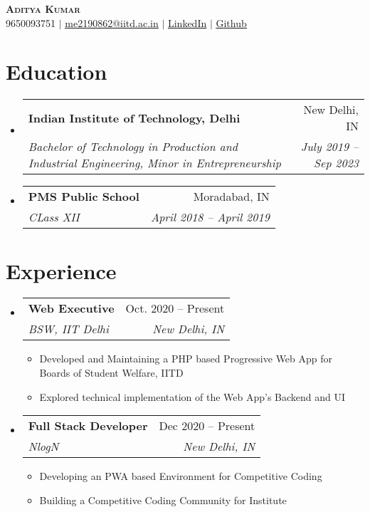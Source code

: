 \documentclass[letterpaper,11pt]{article}
\makeatletter
\newcommand{\resumeItem}[1]{
  \item\small{
    {#1 \vspace{-2pt}}
  }
}
\newcommand{\resumeSubheading}[4]{
  \vspace{-2pt}\item
    \begin{tabular*}{0.97\textwidth}[t]{l@{\extracolsep{\fill}}r}
      \textbf{#1} & #2 \\
      \textit{\small#3} & \textit{\small #4} \\
    \end{tabular*}\vspace{-7pt}
}
\newcommand{\resumeSubHeadingListStart}{\begin{itemize}[leftmargin=0.15in, label={}]}
\newcommand{\resumeSubHeadingListEnd}{\end{itemize}}
\newcommand{\resumeItemListStart}{\begin{itemize}}
\newcommand{\resumeItemListEnd}{\end{itemize}\vspace{-5pt}}
\makeatother
\begin{document}
\begin{center}
    \textbf{\Huge \scshape Aditya Kumar} \\ \vspace{5pt}
    \small 9650093751 $|$ \href{mailto:me2190862@iitd.ac.in}{\underline{me2190862@iitd.ac.in}} $|$ 
    \href{https://linkedin.com/in/aditya-kumar-inductor}{\underline{LinkedIn}} $|$
    \href{https://github.com/inductor69}{\underline{Github}}
\end{center}


\section{Education}
  \resumeSubHeadingListStart
    \resumeSubheading
      {Indian Institute of Technology, Delhi}{New Delhi, IN}
      {Bachelor of Technology in Production and Industrial Engineering, Minor in Entrepreneurship}{July 2019 -- Sep 2023}
    \resumeSubheading
      {PMS Public School}{Moradabad, IN}
      {CLass XII}{April 2018 -- April 2019}
  \resumeSubHeadingListEnd


\section{Experience}
  \resumeSubHeadingListStart

    \resumeSubheading
      {Web Executive}{Oct. 2020 -- Present}
      {BSW, IIT Delhi}{New Delhi, IN}
      \resumeItemListStart
        \resumeItem{Developed and Maintaining a PHP based Progressive Web App for Boards of Student Welfare, IITD}
        \resumeItem{Explored technical implementation of the Web App's Backend and UI}
      \resumeItemListEnd

    \resumeSubheading
      {Full Stack Developer}{Dec 2020 -- Present}
      {NlogN}{New Delhi, IN}
      \resumeItemListStart
        \resumeItem{Developing an PWA based Environment for Competitive Coding     }
        \resumeItem{Building a Competitive Coding Community for Institute}
   
    \resumeItemListEnd

  \resumeSubHeadingListEnd


\end{document}
